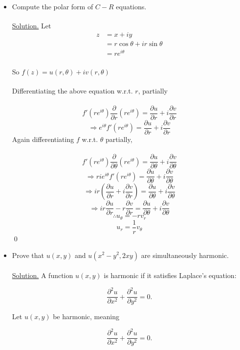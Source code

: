 \documentclass{article}
\begin{document}
\begin{itemize}
    \item Compute the polar form of $C-R$ equations.
    \\
    \\
    \underline{Solution.} Let
    \begin{align}
        z&= x+iy\\
        &=r\cos\theta+ir\sin\theta\\
        &=re^{i\theta}
    \end{align}
    \\
    So $f(z)=u(r,\theta)+iv(r,\theta)$
    \\
    \\
    Differentiating the above equation w.r.t. $r$, partially
    \\
    \\
    \[
    f'(re^{i\theta})\frac{\partial}{\partial r}(re^{i\theta})=\frac{\partial u}{\partial r}+i\frac{\partial v}{\partial r} 
    \]
    \[
    \Rightarrow e^{i\theta}f'(re^{i\theta})=\frac{\partial u}{\partial r}+i\frac{\partial v}{\partial r}
    \]
    Again differentiating $f$ w.r.t. $\theta$ partially,
    \\
    \\
    \[
    f'(re^{i\theta})\frac{\partial}{\partial\theta}(re^{i\theta})=\frac{\partial u}{\partial \theta}+i\frac{\partial v}{\partial \theta}
    \]
    \[
    \Rightarrow rie^{i\theta}f'(re^{i\theta})=\frac{\partial u}{\partial \theta}+i\frac{\partial v}{\partial \theta}
    \]
    \[
    \Rightarrow ir(\frac{\partial u}{\partial r}+i\frac{\partial v}{\partial r})=\frac{\partial u}{\partial \theta}+i\frac{\partial v}{\partial \theta}
    \]
    \[
    \Rightarrow ir\frac{\partial u}{\partial r}-r\frac{\partial v}{\partial r}=\frac{\partial u}{\partial \theta}+i\frac{\partial v}{\partial \theta}
    \]
    \[
    \therefore \boxed{u_\theta=-rv_r}
    \]
    \[
    \boxed{u_r=\frac{1}{r}v_\theta}
    \]
    \qed
    \item Prove that $u(x,y)$ and $u(x^2-y^2, 2xy)$ are simultaneously harmonic.
    \\
    \\
    \underline{Solution.} A function \( u(x, y) \) is harmonic if it satisfies Laplace’s equation:  

\[
\frac{\partial^2 u}{\partial x^2} + \frac{\partial^2 u}{\partial y^2} = 0.
\]

Let \( u(x, y) \) be harmonic, meaning

\[
\frac{\partial^2 u}{\partial x^2} + \frac{\partial^2 u}{\partial y^2} = 0.
\]


\end{itemize}
\end{document}

